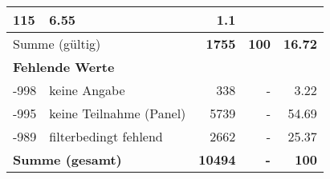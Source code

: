 \begin{longtable}{lXrrr}
       \num{115} &
       \num[round-mode=places,round-precision=2]{6,55} &
         \num[round-mode=places,round-precision=2]{1,1} \\
     \midrule
     \multicolumn{2}{l}{Summe (gültig)} &
       \textbf{\num{1755}} &
     \textbf{100} &
       \textbf{\num[round-mode=places,round-precision=2]{16,72}} \\
     \multicolumn{5}{l}{\textbf{Fehlende Werte}}\\
       -998 &
       keine Angabe &
         \num{338} &
        - &
         \num[round-mode=places,round-precision=2]{3,22} \\
       -995 &
       keine Teilnahme (Panel) &
         \num{5739} &
        - &
         \num[round-mode=places,round-precision=2]{54,69} \\
       -989 &
       filterbedingt fehlend &
         \num{2662} &
        - &
         \num[round-mode=places,round-precision=2]{25,37} \\
     \midrule
     \multicolumn{2}{l}{\textbf{Summe (gesamt)}} &
          \textbf{\num{10494}} &
        \textbf{-} &
        \textbf{100} \\
     \bottomrule
     \end{longtable}
     
